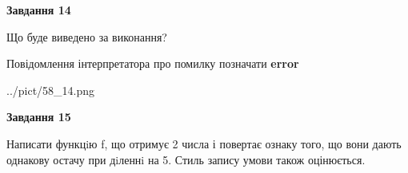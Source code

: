 \documentclass[11pt, ukrainian]{article}
\begin{document}
{\begin {large}
{\begin {center}\textbf{Завдання 14}\end {center}}\par
Що буде виведено за виконання? \par
Повідомлення інтерпретатора про помилку позначати \textbf{error}

\begin{center}
	{../pict/58_14.png}
\end{center}
\newpage

{\begin {center}\textbf{Завдання 15}\end {center}}\par

Написати функцiю f, що отримує 2 числа і повертає ознаку того, що вони дають однакову остачу при дiленнi на 5. Стиль запису умови також оцінюється.\par
\newpage

\end {large}}
\end{document}
